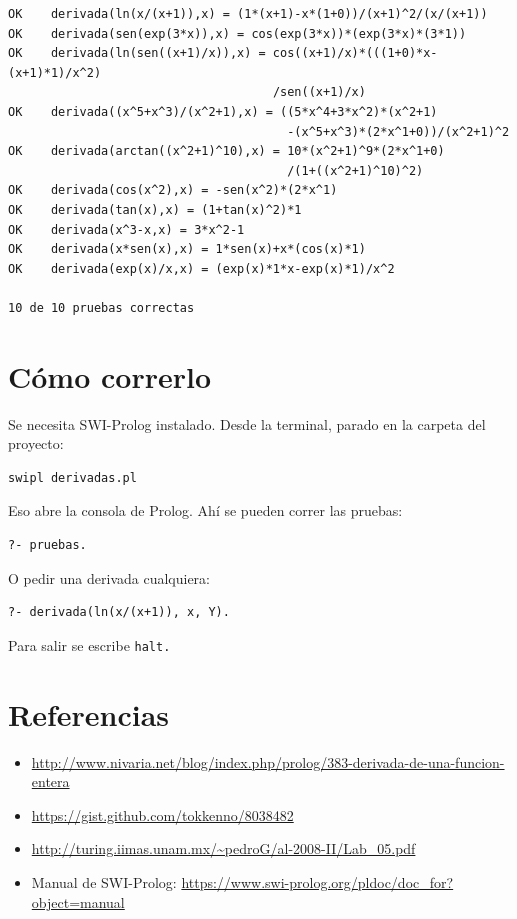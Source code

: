 \documentclass[11pt,letterpaper]{article}
\begin{document}
\begin{lstlisting}
OK    derivada(ln(x/(x+1)),x) = (1*(x+1)-x*(1+0))/(x+1)^2/(x/(x+1))
OK    derivada(sen(exp(3*x)),x) = cos(exp(3*x))*(exp(3*x)*(3*1))
OK    derivada(ln(sen((x+1)/x)),x) = cos((x+1)/x)*(((1+0)*x-(x+1)*1)/x^2)
                                     /sen((x+1)/x)
OK    derivada((x^5+x^3)/(x^2+1),x) = ((5*x^4+3*x^2)*(x^2+1)
                                       -(x^5+x^3)*(2*x^1+0))/(x^2+1)^2
OK    derivada(arctan((x^2+1)^10),x) = 10*(x^2+1)^9*(2*x^1+0)
                                       /(1+((x^2+1)^10)^2)
OK    derivada(cos(x^2),x) = -sen(x^2)*(2*x^1)
OK    derivada(tan(x),x) = (1+tan(x)^2)*1
OK    derivada(x^3-x,x) = 3*x^2-1
OK    derivada(x*sen(x),x) = 1*sen(x)+x*(cos(x)*1)
OK    derivada(exp(x)/x,x) = (exp(x)*1*x-exp(x)*1)/x^2

10 de 10 pruebas correctas
\end{lstlisting}

\section{Cómo correrlo}

Se necesita SWI-Prolog instalado. Desde la terminal, parado en la carpeta del
proyecto:

\begin{lstlisting}
swipl derivadas.pl
\end{lstlisting}

Eso abre la consola de Prolog. Ahí se pueden correr las pruebas:

\begin{lstlisting}
?- pruebas.
\end{lstlisting}

O pedir una derivada cualquiera:

\begin{lstlisting}
?- derivada(ln(x/(x+1)), x, Y).
\end{lstlisting}

Para salir se escribe \texttt{halt.}

\section{Referencias}

\begin{itemize}[noitemsep]
  \item \url{http://www.nivaria.net/blog/index.php/prolog/383-derivada-de-una-funcion-entera}
  \item \url{https://gist.github.com/tokkenno/8038482}
  \item \url{http://turing.iimas.unam.mx/~pedroG/al-2008-II/Lab_05.pdf}
  \item Manual de SWI-Prolog: \url{https://www.swi-prolog.org/pldoc/doc_for?object=manual}
\end{itemize}
\end{document}
